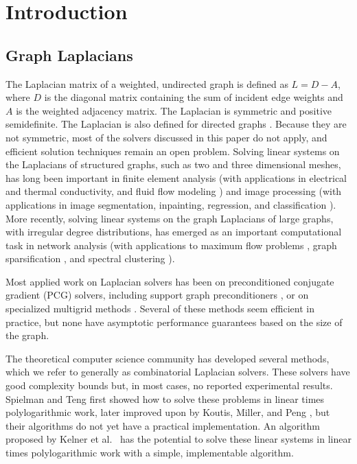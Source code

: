 \documentclass{sig-alternate}
\begin{document}
\section{Introduction}
\subsection{Graph Laplacians}
The Laplacian matrix of a weighted, undirected graph is defined as $L=D-A$,
where $D$ is the diagonal matrix containing the sum of
incident edge weights and
$A$ is the weighted adjacency matrix. The Laplacian is symmetric and positive
semidefinite. The Laplacian is also defined for directed graphs
\cite{AgaevChebotarev2005}. Because they are not symmetric,
most of the solvers discussed
in this paper do not apply, and efficient solution techniques remain
an open problem.
Solving linear systems on the Laplacians of structured graphs,
such as two and three dimensional meshes, has long been important in
finite element analysis (with applications in electrical and thermal
conductivity, and fluid flow modeling \cite{BHV2008})
and image processing (with applications in image segmentation,
inpainting, regression, and classification
\cite{KMT2011,McCannPollard2008,Grady2006}).
More recently,
solving linear systems on the graph Laplacians of
large graphs, with irregular degree distributions,
has emerged as an important computational task in network analysis
(with applications to maximum flow problems \cite{CKMST2011},
graph sparsification \cite{SpielmanSrivastava2011},
and spectral clustering \cite{KhoaChawla2015}).

Most applied work on Laplacian solvers has been on
preconditioned conjugate gradient (PCG) solvers, including support graph
preconditioners \cite{GrembanPHD1996,BGHNT2006,BCHT2004},
or on specialized multigrid
methods \cite{LivneBrandt2012,KMT2011}.
Several of these methods seem efficient in practice, but
none have asymptotic performance guarantees based on the size
of the graph.

The theoretical computer science community has developed several methods,
which we refer to generally as combinatorial Laplacian solvers.
These solvers have good complexity bounds but, in most cases,
no reported experimental results.
Spielman and Teng
\cite{SpielmanTeng2004} first showed
how to solve these problems in
linear times polylogarithmic work, later
improved upon by Koutis, Miller, and Peng \cite{KMP2010},
but their algorithms
do not yet have a practical implementation.
An algorithm proposed by Kelner et al.\ \cite{KOSZ2013}
has the potential to solve these linear
systems in linear times polylogarithmic
work with a simple, implementable algorithm.
\end{document}
